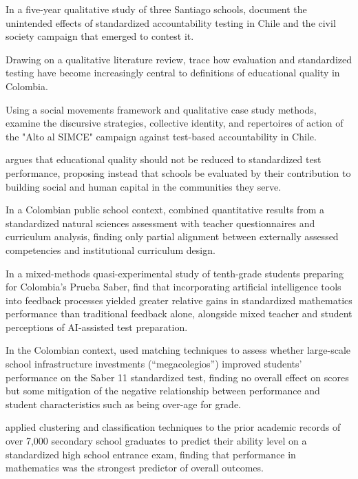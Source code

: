 \documentclass[11pt]{article}
\begin{document}
In a five-year qualitative study of three Santiago schools, \citet{campos2016efectos} document the unintended effects of standardized accountability testing in Chile and the civil society campaign that emerged to contest it.

Drawing on a qualitative literature review, \citet{chavesmanzano2020cavilaciones} trace how evaluation and standardized testing have become increasingly central to definitions of educational quality in Colombia.

Using a social movements framework and qualitative case study methods, \citet{parcerisa2021movimientos} examine the discursive strategies, collective identity, and repertoires of action of the "Alto al SIMCE" campaign against test-based accountability in Chile.

\citet{gomezyepes2004calidad} argues that educational quality should not be reduced to standardized test performance, proposing instead that schools be evaluated by their contribution to building social and human capital in the communities they serve.

In a Colombian public school context, \citet{cardenasbonilla2026pruebas} combined quantitative results from a standardized natural sciences assessment with teacher questionnaires and curriculum analysis, finding only partial alignment between externally assessed competencies and institutional curriculum design.

In a mixed-methods quasi-experimental study of tenth-grade students preparing for Colombia's Prueba Saber, \citet{latorresoles2025iamatematicas} find that incorporating artificial intelligence tools into feedback processes yielded greater relative gains in standardized mathematics performance than traditional feedback alone, alongside mixed teacher and student perceptions of AI-assisted test preparation.

In the Colombian context, \citet{velasco2014megacolegios} used matching techniques to assess whether large-scale school infrastructure investments (``megacolegios'') improved students' performance on the Saber 11\textdegree{} standardized test, finding no overall effect on scores but some mitigation of the negative relationship between performance and student characteristics such as being over-age for grade.

\citet{contreras2024tecnicas} applied clustering and classification techniques to the prior academic records of over 7,000 secondary school graduates to predict their ability level on a standardized high school entrance exam, finding that performance in mathematics was the strongest predictor of overall outcomes.
\end{document}
